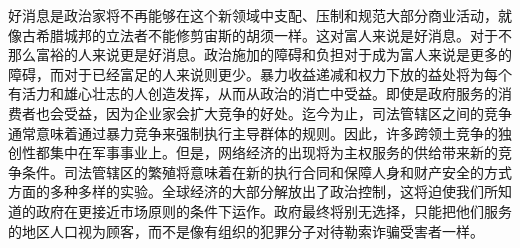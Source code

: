 \begin{paracol}{2}[]
\switchcolumn
好消息是政治家将不再能够在这个新领域中支配、压制和规范大部分商业活动，就像古希腊城邦的立法者不能修剪宙斯的胡须一样。这对富人来说是好消息。对于不那么富裕的人来说更是好消息。政治施加的障碍和负担对于成为富人来说是更多的障碍，而对于已经富足的人来说则更少。暴力收益递减和权力下放的益处将为每个有活力和雄心壮志的人创造发挥，从而从政治的消亡中受益。即使是政府服务的消费者也会受益，因为企业家会扩大竞争的好处。迄今为止，司法管辖区之间的竞争通常意味着通过暴力竞争来强制执行主导群体的规则。因此，许多跨领土竞争的独创性都集中在军事事业上。但是，网络经济的出现将为主权服务的供给带来新的竞争条件。司法管辖区的繁殖将意味着在新的执行合同和保障人身和财产安全的方式方面的多种多样的实验。全球经济的大部分解放出了政治控制，这将迫使我们所知道的政府在更接近市场原则的条件下运作。政府最终将别无选择，只能把他们服务的地区人口视为顾客，而不是像有组织的犯罪分子对待勒索诈骗受害者一样。
\end{paracol}

